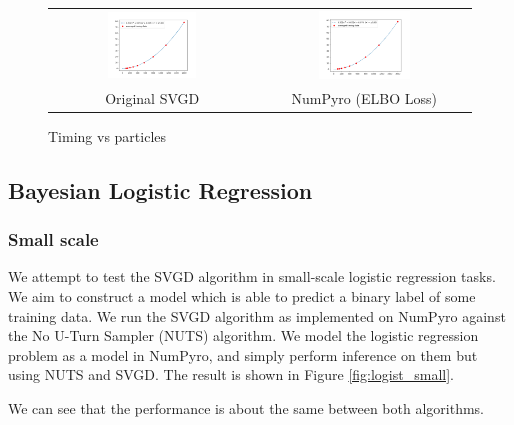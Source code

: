 \begin{figure}[!htbp]
    \centering
    \begin{tabular}{@{}cc@{}}
            \includegraphics[width=0.45\textwidth]{figs/toy-timing-particles.png} & \includegraphics[width=0.45\textwidth]{figs/toy-timing-particles.png}\\
        \small Original SVGD & NumPyro (ELBO Loss) \\
    \end{tabular}
    \caption{Timing vs particles }
    \label{fig:my_label}
\end{figure}

\subsection{Bayesian Logistic Regression}
\subsubsection{Small scale}
We attempt to test the SVGD algorithm in small-scale logistic regression tasks. We aim to construct a model which is able to predict a binary label of some training data. We run the SVGD algorithm as implemented on NumPyro against the No U-Turn Sampler (NUTS) algorithm. We model the logistic regression problem as a model in NumPyro, and simply perform inference on them but using NUTS and SVGD. The result is shown in Figure \ref{fig:logist_small}.

We can see that the performance is about the same between both algorithms.

